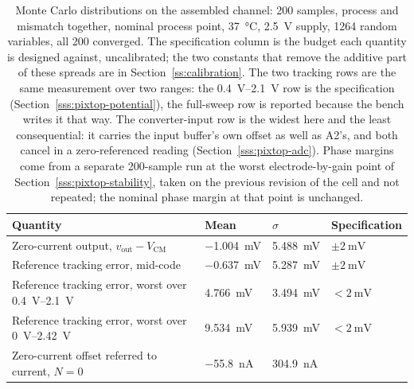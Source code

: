 \begin{table}[!htb]
  \centering
  \caption[{Monte Carlo distributions on the assembled channel.}]{Monte Carlo
  distributions on the assembled channel: 200 samples, process and mismatch
  together, nominal process point, \SI{37}{\celsius}, \SI{2.5}{\volt} supply,
  \num{1264} random variables, all 200 converged. The specification column is
  the budget each quantity is designed against, uncalibrated; the two constants
  that remove the additive part of these spreads are in
  Section~\ref{ss:calibration}. The two tracking rows are the same measurement
  over two ranges: the \SIrange{0.4}{2.1}{\volt} row is the specification
  (Section~\ref{sss:pixtop-potential}), the full-sweep row is reported because
  the bench writes it that way. The converter-input row is the widest here and
  the least consequential: it carries the input buffer's own offset as well as
  A2's, and both cancel in a zero-referenced reading
  (Section~\ref{sss:pixtop-adc}). Phase margins come from a separate 200-sample
  run at the worst electrode-by-gain point of
  Section~\ref{sss:pixtop-stability}, taken on the previous revision of the cell
  and not repeated; the nominal phase margin at that point is unchanged.}
  \label{tab:pixtop-mc}
  {\footnotesize
  \setlength{\tabcolsep}{5pt}
  \begin{tabular}{@{}%
    >{\raggedright\arraybackslash}p{}%
    >{\raggedleft\arraybackslash}p{}%
    >{\raggedleft\arraybackslash}p{}%
    >{\raggedleft\arraybackslash}p{}@{}}
    \toprule
    Quantity & Mean & \(\sigma\) & Specification \\
    \midrule
    Zero-current output, \(v_{\mathrm{out}} - V_{\mathrm{CM}}\) &
      \SI{-1.004}{\milli\volt} & \SI{5.488}{\milli\volt} &
      \(\pm\SI{2}{\milli\volt}\) \\
    Reference tracking error, mid-code &
      \SI{-0.637}{\milli\volt} & \SI{5.287}{\milli\volt} &
      \(\pm\SI{2}{\milli\volt}\) \\
    Reference tracking error, worst over \SIrange{0.4}{2.1}{\volt} &
      \SI{4.766}{\milli\volt} & \SI{3.494}{\milli\volt} &
      \(<\SI{2}{\milli\volt}\) \\
    Reference tracking error, worst over \SIrange{0}{2.42}{\volt} &
      \SI{9.534}{\milli\volt} & \SI{5.939}{\milli\volt} &
      \(<\SI{2}{\milli\volt}\) \\
    \addlinespace
    Zero-current offset referred to current, \(N = 0\) &
      \SI{-55.8}{\nano\ampere} & \SI{304.9}{\nano\ampere} &

\end{tabular}}
\end{table}
